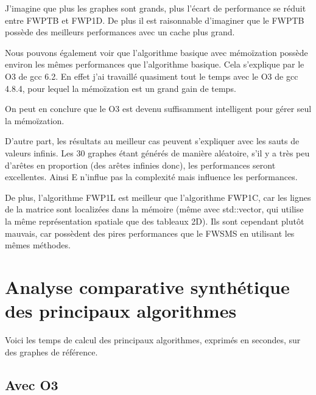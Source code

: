 \documentclass[a4paper,11pt]{article}
\begin{document}
J'imagine que plus les graphes sont grands, plus l'écart de performance se réduit entre FWPTB et FWP1D. De plus il est raisonnable d'imaginer que le FWPTB possède des meilleurs performances avec un cache plus grand.

Nous pouvons également voir que l'algorithme basique avec mémoïzation possède environ les mêmes performances que l'algorithme basique. Cela s'explique par le O3 de gcc 6.2. En effet j'ai travaillé quasiment tout le temps avec le O3 de gcc 4.8.4, pour lequel la mémoïzation est un grand gain de temps.

On peut en conclure que le O3 est devenu suffisamment intelligent pour gérer seul la mémoïzation.

D'autre part, les résultats au meilleur cas peuvent s'expliquer avec les sauts de valeurs infinis. Les 30 graphes étant générés de manière aléatoire, s'il y a très peu d'arêtes en proportion (des arêtes infinies donc), les performances seront excellentes. Ainsi E n'influe pas la complexité mais influence les performances.

De plus, l'algorithme FWP1L est meilleur que l'algorithme FWP1C, car les lignes de la matrice sont localizées dans la mémoire (même avec std::vector, qui utilise la même représentation spatiale que des tableaux 2D). Ils sont cependant plutôt mauvais, car possèdent des pires performances que le FWSMS en utilisant les mêmes méthodes.

\section{Analyse comparative synthétique des principaux algorithmes}

Voici les temps de calcul des principaux algorithmes, exprimés en secondes, sur des graphes de référence.

\subsection{Avec O3}
\end{document}
